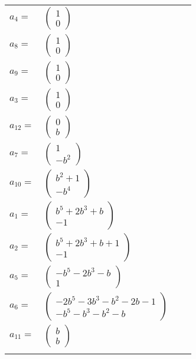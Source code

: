 \documentclass[1p]{elsarticle_modified}
\theoremstyle{definition}
\begin{document}
\begin{tabular}{m{7pt} m{180pt} m{7pt} m{180pt} }
\flushright $a_{4}=$&$\begin{pmatrix}1\\0\end{pmatrix}$ \\
\flushright $a_{8}=$&$\begin{pmatrix}1\\0\end{pmatrix}$ \\
\flushright $a_{9}=$&$\begin{pmatrix}1\\0\end{pmatrix}$ \\
\flushright $a_{3}=$&$\begin{pmatrix}1\\0\end{pmatrix}$ \\
\flushright $a_{12}=$&$\begin{pmatrix}0\\b\end{pmatrix}$ \\
\flushright $a_{7}=$&$\begin{pmatrix}1\\- b^2\end{pmatrix}$ \\
\flushright $a_{10}=$&$\begin{pmatrix}b^2+1\\- b^4\end{pmatrix}$ \\
\flushright $a_{1}=$&$\begin{pmatrix}b^5+2 b^3+b\\-1\end{pmatrix}$ \\
\flushright $a_{2}=$&$\begin{pmatrix}b^5+2 b^3+b+1\\-1\end{pmatrix}$ \\
\flushright $a_{5}=$&$\begin{pmatrix}- b^5-2 b^3- b\\1\end{pmatrix}$ \\
\flushright $a_{6}=$&$\begin{pmatrix}-2 b^5-3 b^3- b^2-2 b-1\\- b^5- b^3- b^2- b\end{pmatrix}$ \\
\flushright $a_{11}=$&$\begin{pmatrix}b\\b\end{pmatrix}$\\&\end{tabular}
\end{document}
